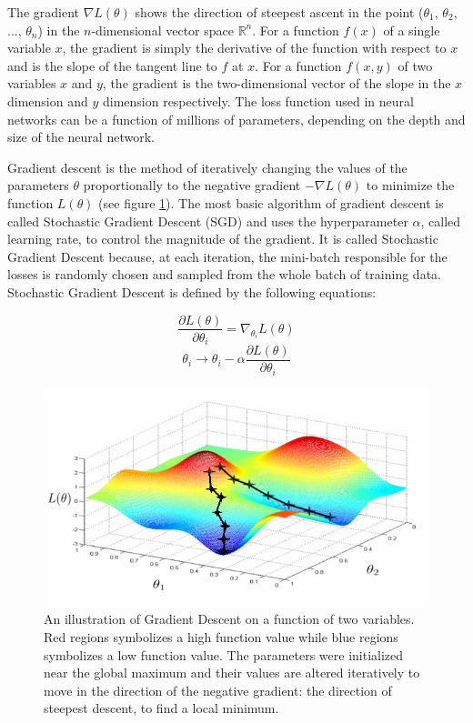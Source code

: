 \documentclass[a4paper, twoside]{article}
\newcommand*{\pd}[2]{\ensuremath{\dfrac{\partial #1}{\partial #2}}}
\begin{document}
The gradient $\nabla L(\theta)$ shows the direction of steepest ascent in the point ($\theta_{1}$, $\theta_{2}$, ..., $\theta_{n}$) in the $n$-dimensional vector space $\mathbb{R}^{n}$. For a function $f(x)$ of a single variable $x$, the gradient is simply the derivative of the function with respect to $x$ and is the slope of the tangent line to $f$ at $x$. For a function $f(x,y)$ of two variables $x$ and $y$, the gradient is the two-dimensional vector of the slope in the $x$ dimension and $y$ dimension respectively. The loss function used in neural networks can be a function of millions of parameters, depending on the depth and size of the neural network. \cite{gradient} \cite{convmath} 

Gradient descent is the method of iteratively changing the values of the parameters $\theta$ proportionally to the negative gradient $-\nabla L(\theta)$ to minimize the function $L(\theta)$ (see figure \ref{figSGD}). The most basic algorithm of gradient descent is called Stochastic Gradient Descent (SGD) and uses the hyperparameter $\alpha$, called learning rate, to control the magnitude of the gradient. It is called Stochastic Gradient Descent because, at each iteration, the mini-batch responsible for the losses is randomly chosen and sampled from the whole batch of training data. Stochastic Gradient Descent is defined by the following equations: \cite{gradient} \cite{convmath} \cite{wikiStanford}

\begin{equation}\label{EQgradient}
\pd{L(\theta)}{\theta_i} = \nabla_{\theta_i} L(\theta)
\end{equation}
\begin{equation}\label{SGD}
{\theta_i} \to {\theta_i} - \alpha \pd{L(\theta)}{\theta_i}
\end{equation}

\begin{figure}[h]
	\centering
  		\includegraphics[scale=1]{gradient-descent.png}
  	\caption{An illustration of Gradient Descent on a function of two variables. Red regions symbolizes a high function value while blue regions symbolizes a low function value. The parameters were initialized near the global maximum and their values are altered iteratively to move in the direction of the negative gradient: the direction of steepest descent, to find a local minimum. \cite{figSGD}} \label{figSGD}
\end{figure}
\end{document}
